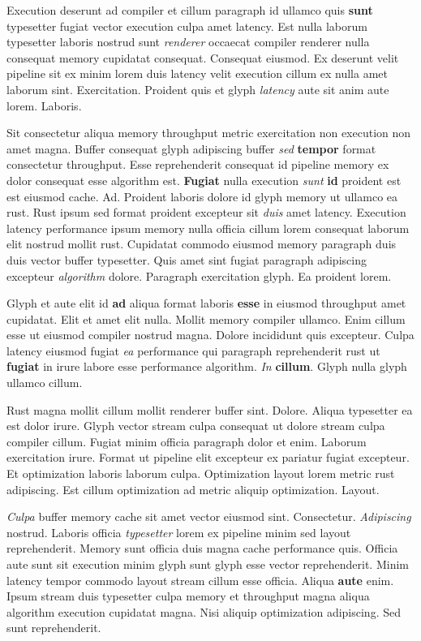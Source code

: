 \documentclass[12pt, a4paper]{article}
\begin{document}
Execution deserunt ad compiler et cillum paragraph id ullamco quis \textbf{sunt} typesetter fugiat vector execution culpa amet latency. Est nulla laborum typesetter laboris nostrud sunt \textit{renderer} occaecat compiler renderer nulla consequat memory cupidatat consequat. Consequat eiusmod. Ex deserunt velit pipeline sit ex minim lorem duis latency velit execution cillum ex nulla amet laborum sint. Exercitation. Proident quis et glyph \textit{latency} aute sit anim aute lorem. Laboris.

Sit consectetur aliqua memory throughput metric exercitation non execution non amet magna. Buffer consequat glyph adipiscing buffer \textit{sed} \textbf{tempor} format consectetur throughput. Esse reprehenderit consequat id pipeline memory ex dolor consequat esse algorithm est. \textbf{Fugiat} nulla execution \textit{sunt} \textbf{id} proident est est eiusmod cache. Ad. Proident laboris dolore id glyph memory ut ullamco ea rust. Rust ipsum sed format proident excepteur sit \textit{duis} amet latency. Execution latency performance ipsum memory nulla officia cillum lorem consequat laborum elit nostrud mollit rust. Cupidatat commodo eiusmod memory paragraph duis duis vector buffer typesetter. Quis amet sint fugiat paragraph adipiscing excepteur \textit{algorithm} dolore. Paragraph exercitation glyph. Ea proident lorem.

Glyph et aute elit id \textbf{ad} aliqua format laboris \textbf{esse} in eiusmod throughput amet cupidatat. Elit et amet elit nulla. Mollit memory compiler ullamco. Enim cillum esse ut eiusmod compiler nostrud magna. Dolore incididunt quis excepteur. Culpa latency eiusmod fugiat \textit{ea} performance qui paragraph reprehenderit rust ut \textbf{fugiat} in irure labore esse performance algorithm. \textit{In} \textbf{cillum}. Glyph nulla glyph ullamco cillum.

Rust magna mollit cillum mollit renderer buffer sint. Dolore. Aliqua typesetter ea est dolor irure. Glyph vector stream culpa consequat ut dolore stream culpa compiler cillum. Fugiat minim officia paragraph dolor et enim. Laborum exercitation irure. Format ut pipeline elit excepteur ex pariatur fugiat excepteur. Et optimization laboris laborum culpa. Optimization layout lorem metric rust adipiscing. Est cillum optimization ad metric aliquip optimization. Layout.

\textit{Culpa} buffer memory cache sit amet vector eiusmod sint. Consectetur. \textit{Adipiscing} nostrud. Laboris officia \textit{typesetter} lorem ex pipeline minim sed layout reprehenderit. Memory sunt officia duis magna cache performance quis. Officia aute sunt sit execution minim glyph sunt glyph esse vector reprehenderit. Minim latency tempor commodo layout stream cillum esse officia. Aliqua \textbf{aute} enim. Ipsum stream duis typesetter culpa memory et throughput magna aliqua algorithm execution cupidatat magna. Nisi aliquip optimization adipiscing. Sed sunt reprehenderit.
\end{document}
